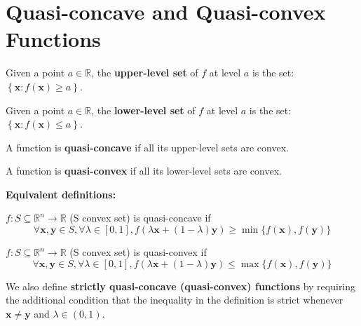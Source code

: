 \section{Quasi-concave and Quasi-convex Functions}

\begin{definition}
    Given a point \(a \in \mathbb{R}\), the \textbf{upper-level set} of \(f\) at level \(a\) is the set: \(\left\{\mathbf{x}: f(\mathbf{x}) \geq a\right\}\).
\end{definition}


\begin{definition}
    Given a point \(a \in \mathbb{R}\), the \textbf{lower-level set} of \(f\) at level \(a\) is the set: \(\left\{\mathbf{x}: f(\mathbf{x}) \leq a\right\}\).
\end{definition}


\begin{definition}
    A function is \textbf{quasi-concave} if all its upper-level sets are convex.
\end{definition}

\begin{definition}
    A function is \textbf{quasi-convex} if all its lower-level sets are convex.
\end{definition}

\textbf{Equivalent definitions:}

\begin{definition}
    \(f:S\subseteq \mathbb{R}^{n}\longrightarrow \mathbb{R}\) (S convex set) is quasi-concave if
    \[
        \forall \mathbf{x},\mathbf{y}\in S,\forall \lambda \in [0,1],f(\lambda \mathbf{x} + (1 - \lambda)\mathbf{y})\geq \min \{f(\mathbf{x}),f(\mathbf{y})\}
    \]
\end{definition}

\begin{definition}
    \(f:S\subseteq \mathbb{R}^{n}\longrightarrow \mathbb{R}\) (S convex set) is quasi-convex if
    \[
        \forall \mathbf{x},\mathbf{y}\in S,\forall \lambda \in [0,1],f(\lambda \mathbf{x} + (1 - \lambda)\mathbf{y})\leq \max \{f(\mathbf{x}),f(\mathbf{y})\}
    \]
\end{definition}

We also define \textbf{strictly quasi-concave (quasi-convex) functions} by requiring the additional condition that the inequality in the definition is strict whenever \(\mathbf{x}\neq \mathbf{y}\) and \(\lambda \in (0,1)\).

